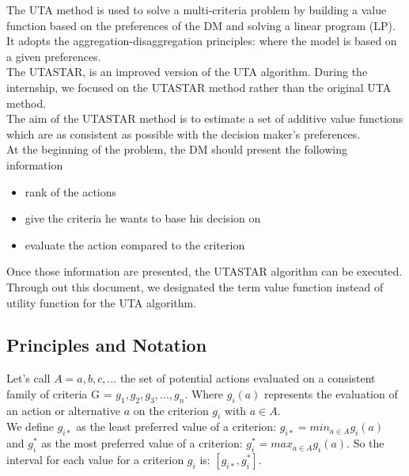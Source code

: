 \documentclass{report}
\begin{document}
The UTA method is used to solve a multi-criteria problem by building a value function based on the preferences of the DM and solving a linear program (LP). It adopts the aggregation-disaggregation principles: where the model is based on a given preferences.\\ The UTASTAR, is an improved version of the UTA algorithm. During the internship, we focused on the UTASTAR method rather than the original UTA method.\\The aim of the UTASTAR method is to estimate a set of additive value functions which are as consistent as possible with the decision maker's preferences.\\

At the beginning of the problem, the DM should present the following information 
\begin{itemize}
\item rank of the actions
\item give the criteria he wants to base his decision on 
\item evaluate the action compared to the criterion
\end{itemize}
Once those information are presented, the UTASTAR algorithm can be executed. \\

Through out this document, we designated the term value function instead of utility function for the UTA algorithm.\\

\newpage
\subsection{Principles and Notation}
Let's call $A={a,b,c,...}$ the set of potential actions evaluated on a consistent family of criteria G = ${g_1, g_2, g_3, ..., g_n}$. Where $g_i(a)$ represents the evaluation of an action or alternative $a$ on the criterion $g_i$ with $a \in A$. \\

We define $g_{i*}$ as the least preferred value of a criterion: $g_{i*} = min_{a \in A} g_i (a)$ and $g_i^{*}$ as the most preferred value of a criterion: $g_i^{*} = max_{a \in A} g_i (a)$. So the interval for each value for a criterion $g_i$ is: $[g_{i*} , g_i^{*}]$.\\
\end{document}
